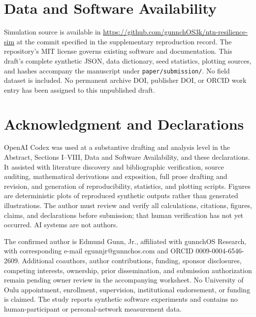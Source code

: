 \documentclass{IEEEoj}
\begin{document}
\section*{Data and Software Availability}
Simulation source is available in \url{https://github.com/gunnchOS3k/ntn-resilience-sim} at the commit specified in the supplementary reproduction record. The repository's MIT license governs existing software and documentation. This draft's complete synthetic JSON, data dictionary, seed statistics, plotting sources, and hashes accompany the manuscript under \texttt{paper/submission/}. No field dataset is included. No permanent archive DOI, publisher DOI, or ORCID work entry has been assigned to this unpublished draft.

\section*{Acknowledgment and Declarations}
OpenAI Codex was used at a substantive drafting and analysis level in the Abstract, Sections I--VIII, Data and Software Availability, and these declarations. It assisted with literature discovery and bibliographic verification, source auditing, mathematical derivations and exposition, full prose drafting and revision, and generation of reproducibility, statistics, and plotting scripts. Figures are deterministic plots of reproduced synthetic outputs rather than generated illustrations. The author must review and verify all calculations, citations, figures, claims, and declarations before submission; that human verification has not yet occurred. AI systems are not authors.

The confirmed author is Edmund Gunn, Jr., affiliated with gunnchOS Research, with corresponding e-mail egunnjr@gunnchos.com and ORCID 0009-0004-6546-2609. Additional coauthors, author contributions, funding, sponsor disclosures, competing interests, ownership, prior dissemination, and submission authorization remain pending owner review in the accompanying worksheet. No University of Oulu appointment, enrollment, supervision, institutional endorsement, or funding is claimed. The study reports synthetic software experiments and contains no human-participant or personal-network measurement data.



\end{document}
